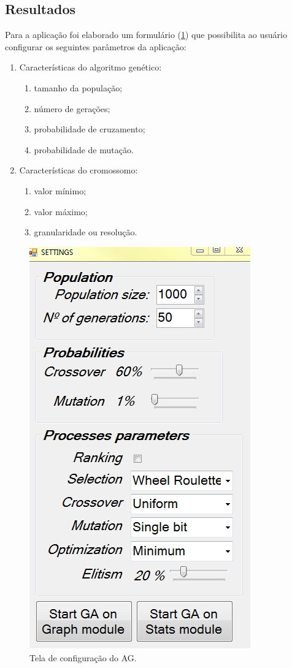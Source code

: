 \documentclass[twoside]{article}
\begin{document}
\begin{multicols}{2}
\section{Resultados}
Para a aplicação foi elaborado um formulário (\ref {fig:userview}) que possibilita ao usuário configurar os seguintes parâmetros da aplicação:
\begin{enumerate}
\item Características do algoritmo genético:
\begin{enumerate}
\item tamanho da população;
\item número de gerações;
\item probabilidade de cruzamento;
\item probabilidade de mutação.
\end{enumerate}
\item Características do cromossomo:
\begin{enumerate}
\item valor mínimo;
\item valor máximo;
\item granularidade ou resolução.
\end{enumerate}
\end{enumerate}

\begin{figure}[H]
\label{fig:userview}
  \caption{Tela de configuração do AG.}
  \centering
    \includegraphics[scale = 0.45]{user_view.png}
\end{figure}


\end{multicols}
\end{document}
